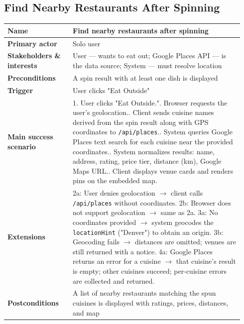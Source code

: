 \documentclass[sigconf]{acmart}
\begin{document}
\subsection*{Find Nearby Restaurants After Spinning}
{\footnotesize
\begin{supertabular}{@{}p{0.26\linewidth}p{0.68\linewidth}@{}}
\textbf{Name} & Find nearby restaurants after spinning \\
\hline
\textbf{Primary actor} & Solo user \\
\hline
\textbf{Stakeholders \& interests} & User --- wants to eat out; Google Places API --- is the data source; System --- must resolve location \\
\hline
\textbf{Preconditions} & A spin result with at least one dish is displayed \\
\hline
\textbf{Trigger} & User clicks "Eat Outside" \\
\hline
\textbf{Main success scenario} & 1. User clicks "Eat Outside.". Browser requests the user's geolocation.. Client sends cuisine names derived from the spin result along with GPS coordinates to \texttt{/api/places}.. System queries Google Places text search for each cuisine near the provided coordinates.. System normalizes results: name, address, rating, price tier, distance (km), Google Maps URL.. Client displays venue cards and renders pins on the embedded map. \\
\hline
\textbf{Extensions} & 2a: User denies geolocation $\rightarrow$ client calls \texttt{/api/places} without coordinates.\newline
2b: Browser does not support geolocation $\rightarrow$ same as 2a.\newline
3a: No coordinates provided $\rightarrow$ system geocodes the \texttt{locationHint} ("Denver") to obtain an origin.\newline
3b: Geocoding fails $\rightarrow$ distances are omitted; venues are still returned with a notice.\newline
4a: Google Places returns an error for a cuisine $\rightarrow$ that cuisine's result is empty; other cuisines succeed; per-cuisine errors are collected and returned. \\
\hline
\textbf{Postconditions} & A list of nearby restaurants matching the spun cuisines is displayed with ratings, prices, distances, and map \\
\end{supertabular}
}
\end{document}
